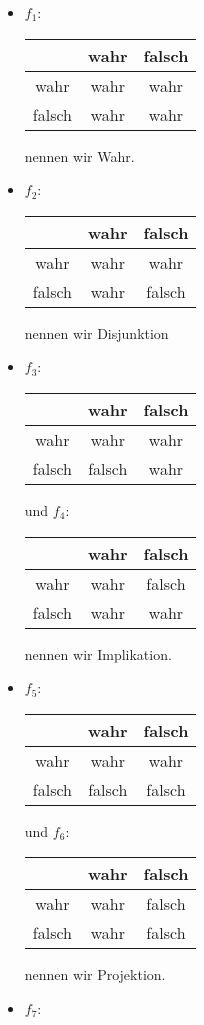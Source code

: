 \begin{solution}
\phantom{}
\begin{itemize}
  \item $f_1$:\quad\begin{tabular}{|c||c|c|}
\hline
 & wahr & falsch \\
\hline
\hline
wahr & wahr & wahr \\
\hline
falsch & wahr & wahr \\
\hline
\end{tabular} nennen wir Wahr.
  \item $f_2$:\quad\begin{tabular}{|c||c|c|}
\hline
& wahr & falsch \\
\hline
\hline
wahr & wahr & wahr \\
\hline
falsch & wahr & falsch \\
\hline
\end{tabular} nennen wir Disjunktion
\item $f_3$:\quad\begin{tabular}{|c||c|c|}
\hline
& wahr & falsch \\
\hline
\hline
wahr & wahr & wahr \\
\hline
falsch & falsch & wahr \\
\hline
\end{tabular} und
$f_4$:\quad\begin{tabular}{|c||c|c|}
\hline
& wahr & falsch \\
\hline
\hline
wahr & wahr & falsch \\
\hline
falsch & wahr & wahr \\
\hline
\end{tabular}
nennen wir Implikation.
\item $f_5$:\quad\begin{tabular}{|c||c|c|}
\hline
& wahr & falsch \\
\hline
\hline
wahr & wahr & wahr \\
\hline
falsch & falsch & falsch \\
\hline
\end{tabular} und
$f_6$:\quad\begin{tabular}{|c||c|c|}
\hline
& wahr & falsch \\
\hline
\hline
wahr & wahr & falsch \\
\hline
falsch & wahr & falsch\\
\hline
\end{tabular} nennen wir Projektion.
\item
$f_7$:\quad\begin{tabular}{|c||c|c|}

\end{tabular}
\end{itemize}
\end{solution}
